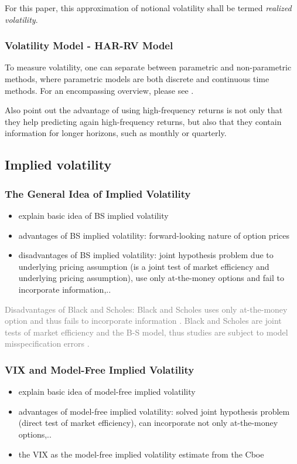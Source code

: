 For this paper, this approximation of notional volatility shall be termed \emph{realized volatility}.



\subsubsection{Volatility Model - HAR-RV Model}

To measure volatility, one can separate between parametric and non-parametric methods, where parametric models are both discrete and continuous time methods. For an encompassing overview, please see \citeauthor{andersen2001}. 

Also \citeauthor{andersen2003} point out the advantage of using high-frequency returns is not only that they help predicting again high-frequency returns, but also that they contain information for longer horizons, such as monthly or quarterly. 


\subsection{Implied volatility}
\subsubsection{The General Idea of Implied Volatility}
\begin{itemize}\itemsep0pt
\item explain basic idea of BS implied volatility
\item advantages of BS implied volatility: forward-looking nature of option prices
\item disadvantages of BS implied volatility: joint hypothesis problem due to underlying  pricing assumption (is a joint test of market efficiency and underlying pricing assumption), use only at-the-money options and fail to incorporate information,..
\end{itemize}

\textcolor{gray}{
Disadvantages of Black and Scholes: Black and Scholes uses only at-the-money option and thus fails to incorporate information \parencite{jiang2003}.
Black and Scholes are joint tests of market efficiency and the B-S model, thus studies are subject to model misspecification errors \parencite{jiang2003}.}

\subsubsection{VIX and Model-Free Implied Volatility}
\begin{itemize}\itemsep0pt
\item explain basic idea of model-free implied volatility
\item advantages of model-free implied volatility: solved joint hypothesis problem (direct test of market efficiency), can incorporate not only at-the-money options,..
\item the VIX as the model-free implied volatility estimate from the Cboe 
\end{itemize}

